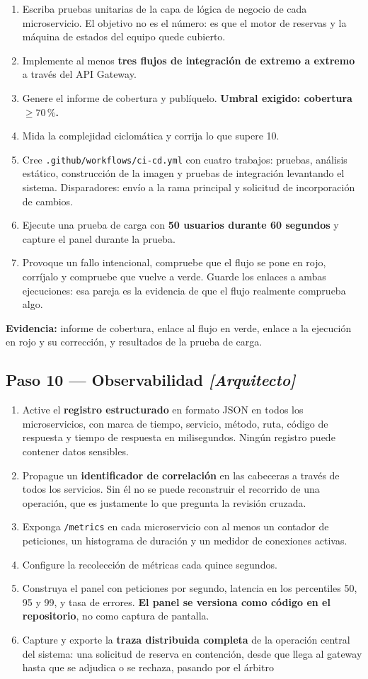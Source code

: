 \documentclass[11pt,a4paper]{article}
\newcommand{\paso}[1]{\subsection{#1}}
\begin{document}
	\begin{enumerate}[leftmargin=*,itemsep=4pt]
		\item Escriba pruebas unitarias de la capa de lógica de negocio de cada microservicio. El objetivo no es el número: es que el motor de reservas y la máquina de estados del equipo quede cubierto.
		\item Implemente al menos \textbf{tres flujos de integración de extremo a extremo} a través del API Gateway.
		\item Genere el informe de cobertura y publíquelo. \textbf{Umbral exigido: cobertura $\geq 70\,\%$.}
		\item Mida la complejidad ciclomática y corrija lo que supere 10.
		\item Cree \texttt{.github/workflows/ci-cd.yml} con cuatro trabajos: pruebas, análisis estático, construcción de la imagen y pruebas de integración levantando el sistema. Disparadores: envío a la rama principal y solicitud de incorporación de cambios.
		\item Ejecute una prueba de carga con \textbf{50 usuarios durante 60 segundos} y capture el panel durante la prueba.
		\item Provoque un fallo intencional, compruebe que el flujo se pone en rojo, corríjalo y compruebe que vuelve a verde. Guarde los enlaces a ambas ejecuciones: esa pareja es la evidencia de que el flujo realmente comprueba algo.
	\end{enumerate}
	
	\textbf{Evidencia:} informe de cobertura, enlace al flujo en verde, enlace a la ejecución en rojo y su corrección, y resultados de la prueba de carga.
	
	\paso{Paso 10 --- Observabilidad \emph{[Arquitecto]}}
	
	\begin{enumerate}[leftmargin=*,itemsep=4pt]
		\item Active el \textbf{registro estructurado} en formato JSON en todos los microservicios, con marca de tiempo, servicio, método, ruta, código de respuesta y tiempo de respuesta en milisegundos. Ningún registro puede contener datos sensibles.
		\item Propague un \textbf{identificador de correlación} en las cabeceras a través de todos los servicios. Sin él no se puede reconstruir el recorrido de una operación, que es justamente lo que pregunta la revisión cruzada.
		\item Exponga \texttt{/metrics} en cada microservicio con al menos un contador de peticiones, un histograma de duración y un medidor de conexiones activas.
		\item Configure la recolección de métricas cada quince segundos.
		\item Construya el panel con peticiones por segundo, latencia en los percentiles 50, 95 y 99, y tasa de errores. \textbf{El panel se versiona como código en el repositorio}, no como captura de pantalla.
		\item Capture y exporte la \textbf{traza distribuida completa} de la operación central del sistema: una solicitud de reserva en contención, desde que llega al gateway hasta que se adjudica o se rechaza, pasando por el árbitro
	\end{enumerate}
	
\end{document}

